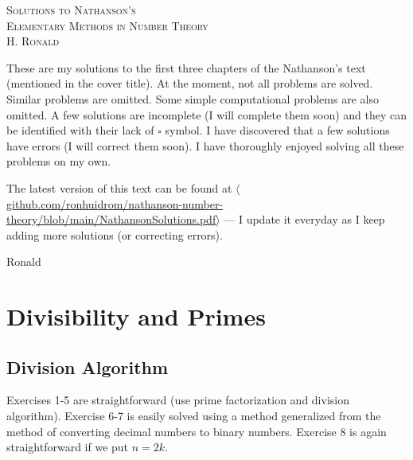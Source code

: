 \documentclass[11pt, leqno]{article}
\begin{document}
\setlength{\abovedisplayskip}{0pt}
\setlength{\belowdisplayskip}{0pt}
\setlength{\abovedisplayshortskip}{0pt}
\setlength{\belowdisplayshortskip}{0pt}

\thispagestyle{empty}

\pagebreak
\hspace{0pt}
\vfill
\begin{center}
  \Large
  \textsc{Solutions to Nathanson's \\
    Elementary Methods in Number Theory} \\
  \vspace{1em}
  \large
  \textsc{H. Ronald}
\end{center}
\vfill
\hspace{0pt}
\pagebreak

\clearpage
\thispagestyle{empty}


\pagebreak
\hspace{0pt}
\vfill
These are my solutions to the first three chapters of the Nathanson's text (mentioned in the cover title). At the moment, not all problems are solved. Similar problems are omitted. Some simple computational problems are also omitted. A few solutions are incomplete (I will complete them soon) and they can be identified with their lack of $\square{}$ symbol. I have discovered that a few solutions have errors (I will correct them soon). I have thoroughly enjoyed solving all these problems on my own.

The latest version of this text can be found at $\langle$\hyperref{https://github.com/ronhuidrom/nathanson-number-theory/blob/main/NathansonSolutions.pdf}{}{}{github.com/ronhuidrom/nathanson-number-theory/blob/main/NathansonSolutions.pdf}$\rangle$ --- I update it everyday as I keep adding more solutions (or correcting errors).

\hfill Ronald
\vfill
\hspace{0pt}
\pagebreak
\clearpage

\tableofcontents
\clearpage

\normalsize
\section{Divisibility and Primes}

\subsection{Division Algorithm}

Exercises 1-5 are straightforward (use prime factorization and division algorithm). Exercise 6-7 is easily solved using a method generalized from the method of converting decimal numbers to binary numbers. Exercise 8 is again straightforward if we put $n=2k$.
\end{document}
